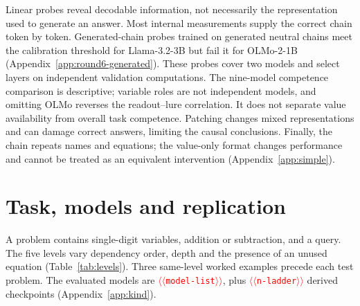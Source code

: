 \documentclass[11pt]{article}
\providecommand{\NUM}[1]{\textcolor{red}{$\langle\langle$\texttt{#1}$\rangle\rangle$}}
\begin{document}
Linear probes reveal decodable information, not necessarily the representation used to generate
an answer. Most internal measurements supply the correct chain token by token. Generated-chain
probes trained on generated neutral chains meet the calibration threshold for Llama-3.2-3B
but fail it for OLMo-2-1B (Appendix~\ref{app:round6-generated}). These probes cover two models
and select layers on independent validation computations. The nine-model competence comparison is descriptive;
variable roles are not independent models, and omitting OLMo reverses the readout--lure
correlation. It does not separate value availability from overall task competence.
Patching changes mixed representations and can damage
correct answers, limiting the causal conclusions. Finally, the chain repeats names and equations;
the value-only format changes performance and cannot be treated as an equivalent intervention
(Appendix~\ref{app:simple}).



\appendix

\section{Task, models and replication}
\label{app:task}
A problem contains single-digit variables, addition or subtraction, and a query. The five
levels vary dependency order, depth and the presence of an unused equation
(Table~\ref{tab:levels}). Three same-level worked examples precede each test problem.
The evaluated models are \NUM{model-list}, plus \NUM{n-ladder} derived checkpoints
(Appendix~\ref{app:kind}).

\begin{table}[t]
\centering\small\setlength{\tabcolsep}{4pt}
\caption{The five levels of \citet{kudo2026faithful}: additions or subtractions needed
(\emph{Steps}), variables unresolved when first read (\emph{Held}), and unused equations
(\emph{Distr.}). At level~1 the intermediate value is stated rather than computed.}
\label{tab:levels}
\end{table}
\end{document}
